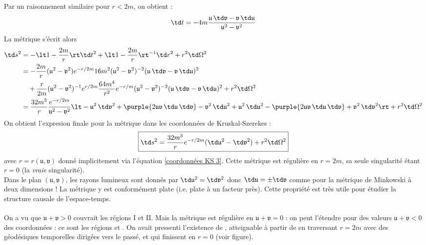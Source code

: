 Par un raisonnement similaire pour $r<2m$, on obtient :
\begin{equation}
    \td t = - 4m \frac{\mathfrak{u} \, \td \mathfrak{v} - \mathfrak{v} \, \td \mathfrak{u}}{\mathfrak{u}^2 - \mathfrak{v}^2} 
\end{equation}
La métrique s'écrit alors
\begin{align*}
    \td s^2 &= - \lt 1 - \frac{2m}{r} \rt \td t^2 + \lt 1 - \frac{2m}{r} \rt^{-1} \td r^2 + r^2 \td \Omega^2 \\
    &= - \frac{2m}{r} (\mathfrak{u}^2 - \mathfrak{v}^2) e^{-r/2m} 16 m^2 (\mathfrak{u}^2 - \mathfrak{v}^2 )^{-2} (\mathfrak{u} \, \td \mathfrak{v} - \mathfrak{v} \, \td \mathfrak{u})^2 \\
    & \quad + \frac{r}{2m} (\mathfrak{u}^2 - \mathfrak{v}^2)^{-1} e^{r/2m} \frac{64m^4}{r^2} e^{-r/m} (\mathfrak{u}^2 - \mathfrak{v}^2 )^{-2} (\mathfrak{u} \, \td \mathfrak{v} - \mathfrak{v} \, \td \mathfrak{u})^2 + r^2 \td \Omega^2\\
    &= \frac{32 m^3}{r} \frac{e^{-r/2m}}{\mathfrak{u}^2 - \mathfrak{v}^2} \lt - \mathfrak{u}^2 \, \td \mathfrak{v}^2 + \purple{2 \mathfrak{u} \mathfrak{v} \, \td \mathfrak{u} \, \td \mathfrak{v}} - \mathfrak{v}^2 \, \td \mathfrak{u}^2 + \mathfrak{u}^2 \, \td \mathfrak{u}^2 - \purple{ 2 \mathfrak{u} \mathfrak{v} \, \td \mathfrak{u} \, \td \mathfrak{v}} + \mathfrak{v}^2 \, \td \mathfrak{v}^2 \rt + r^2 \td \Omega^2
\end{align*}
On obtient l'expresion finale pour la métrique dans les coordonnées de Kruskal-Szerekes :
\begin{align}
    \label{métrique KS}
    \boxed{\td s^2 = \frac{32 m^3}{r} e^{-r/2m} ( \td \mathfrak{u}^2 - \td \mathfrak{v}^2) + r^2 \td \Omega^2 }
\end{align}
avec $r = r(\mathfrak{u},\mathfrak{v})$ donné implicitement via l'équation \ref{coordonnées KS 3}. Cette métrique est régulière en $r=2m$, sa seule singularité étant $r=0$ (la \emph{vraie} singularité).\\
Dans le plan $(\mathfrak{u},\mathfrak{v})$, les rayons lumineux sont donnés par $\td \mathfrak{u}^2 = \td \mathfrak{v}^2$ donc $\td \mathfrak{u} = \pm \td \mathfrak{v}$ comme pour la métrique de Minkowski à deux dimensions ! La métrique y est conformément plate (i.e. plate à un facteur près). Cette propriété est très utile pour étudier la structure causale de l'espace-temps.\\
\\
On a vu que $\mathfrak{u} + \mathfrak{v}>0$ couvrait les régions I et II. Mais la métrique est régulière en $\mathfrak{u} + \mathfrak{v} = 0$ : on peut l'étendre pour des valeurs $\mathfrak{u} + \mathfrak{v}<0$ des coordonnées : ce sont les régions  et . On avait pressenti l'existence de , atteignable à partir de  en traversant $r=2m$ avec des géodésiques temporelles dirigées vers le passé, et qui finissent en $r=0$ (voir figure).
